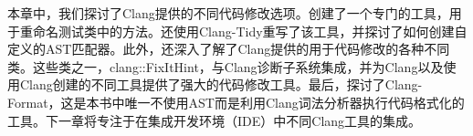 本章中，我们探讨了Clang提供的不同代码修改选项。创建了一个专门的工具，用于重命名测试类中的方法。还使用Clang-Tidy重写了该工具，并探讨了如何创建自定义的AST匹配器。此外，还深入了解了Clang提供的用于代码修改的各种不同类。这些类之一，clang::FixItHint，与Clang诊断子系统集成，并为Clang以及使用Clang创建的不同工具提供了强大的代码修改工具。最后，探讨了Clang-Format，这是本书中唯一不使用AST而是利用Clang词法分析器执行代码格式化的工具。下一章将专注于在集成开发环境（IDE）中不同Clang工具的集成。
